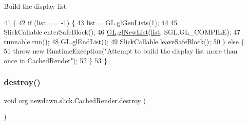 Build the display list 
\begin{DoxyCode}
41                          \{
42         \textcolor{keywordflow}{if} (\mbox{\hyperlink{classorg_1_1newdawn_1_1slick_1_1_cached_render_a0f2a2eb4568a66cd3b2c3bc6d7e6ad83}{list}} == -1) \{
43             \mbox{\hyperlink{classorg_1_1newdawn_1_1slick_1_1_cached_render_a0f2a2eb4568a66cd3b2c3bc6d7e6ad83}{list}} = \mbox{\hyperlink{classorg_1_1newdawn_1_1slick_1_1_cached_render_ac66ef801567b1c74e2cb8d5f47045dc4}{GL}}.\mbox{\hyperlink{interfaceorg_1_1newdawn_1_1slick_1_1opengl_1_1renderer_1_1_s_g_l_a2c623d00bb2450569a6c86a71024b83d}{glGenLists}}(1);
44             
45             SlickCallable.enterSafeBlock();
46             \mbox{\hyperlink{classorg_1_1newdawn_1_1slick_1_1_cached_render_ac66ef801567b1c74e2cb8d5f47045dc4}{GL}}.\mbox{\hyperlink{interfaceorg_1_1newdawn_1_1slick_1_1opengl_1_1renderer_1_1_s_g_l_a85746cd7e0de9297a821619097a5f7cc}{glNewList}}(\mbox{\hyperlink{classorg_1_1newdawn_1_1slick_1_1_cached_render_a0f2a2eb4568a66cd3b2c3bc6d7e6ad83}{list}}, SGL.GL\_COMPILE);
47             \mbox{\hyperlink{classorg_1_1newdawn_1_1slick_1_1_cached_render_adbb423a793a3b64353bf95ccdf9a99e9}{runnable}}.run();
48             \mbox{\hyperlink{classorg_1_1newdawn_1_1slick_1_1_cached_render_ac66ef801567b1c74e2cb8d5f47045dc4}{GL}}.\mbox{\hyperlink{interfaceorg_1_1newdawn_1_1slick_1_1opengl_1_1renderer_1_1_s_g_l_a300a1d9b3c984ccc0a59eb951821bf37}{glEndList}}();
49             SlickCallable.leaveSafeBlock();
50         \} \textcolor{keywordflow}{else} \{
51             \textcolor{keywordflow}{throw} \textcolor{keyword}{new} RuntimeException(\textcolor{stringliteral}{"Attempt to build the display list more than once in CachedRender"});
52         \}
53     \}
\end{DoxyCode}
\mbox{\label{classorg_1_1newdawn_1_1slick_1_1_cached_render_a194e9daac130a45cdcb6ea944819a4e2}} 
\subsubsection{\texorpdfstring{destroy()}{destroy()}}
{\footnotesize\ttfamily void org.\+newdawn.\+slick.\+Cached\+Render.\+destroy (\begin{DoxyParamCaption}{ }\end{DoxyParamCaption})\hspace{0.3cm}{\ttfamily [inline]}}

